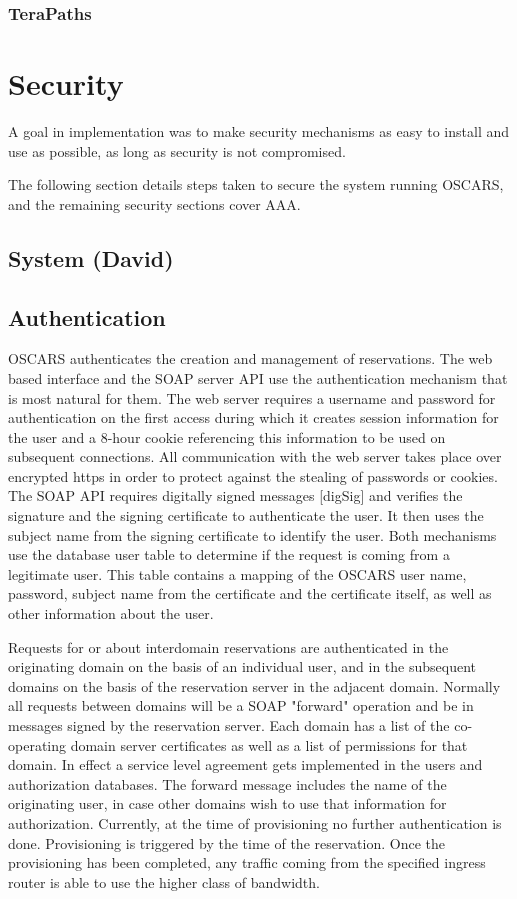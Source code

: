 \documentclass[conference]{IEEEtran}
\begin{document}
\subsubsection{TeraPaths}


\section{Security}
A goal in implementation was to make security mechanisms as easy to install
and use as possible, as long as security is not compromised.

The following section details steps taken to secure the system running
OSCARS, and the remaining security sections cover AAA.

\subsection{System (David)}

\subsection{Authentication}
OSCARS authenticates the creation and management of
reservations. The web based interface and the SOAP server API use the
authentication mechanism that is most natural for them. The web server
requires a username and password for authentication on the first
access during which it creates session information for the user and a
8-hour cookie referencing this information to be used on subsequent
connections. All communication with the web server takes place over
encrypted https in order to protect against the stealing of passwords
or cookies. The SOAP API requires digitally signed messages [digSig]
and verifies the signature and the signing certificate to authenticate
the user. It then uses the subject name from the signing certificate
to identify the user. Both mechanisms use the database user table to
determine if the request is coming from a legitimate user. This table
contains a mapping of the OSCARS user name, password, subject name
from the certificate and the certificate itself, as well as other
information about the user.

Requests for or about interdomain
reservations are authenticated in the originating domain on the basis
of an individual user, and in the subsequent domains on the basis of
the reservation server in the adjacent domain. Normally all requests
between domains will be a SOAP "forward" operation and be in messages
signed by the reservation server. Each domain has a list of the
co-operating domain server certificates as well as a list of
permissions for that domain. In effect a service level agreement gets
implemented in the users and authorization databases. The forward
message includes the name of the originating user, in case other
domains wish to use that information for authorization.
 Currently, at
the time of provisioning no further authentication is
done. Provisioning is triggered by the time of the reservation. Once
the provisioning has been completed, any traffic coming from the
specified ingress router is able to use the higher class of bandwidth.
\end{document}
